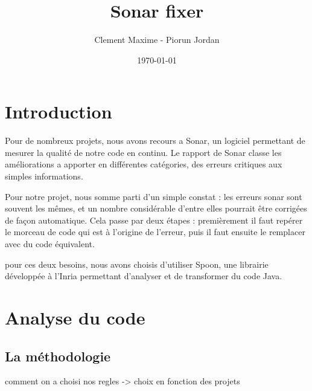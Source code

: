 \documentclass[a4paper]{article}
\begin{document}
\clearpage
\vspace*{\fill}
\begin{center}
\begin{minipage}{.6\textwidth}
\title{Sonar fixer}
\author{Clement Maxime - Piorun Jordan}
\date{\today}
\maketitle
\end{minipage}

\end{center}
\vfill %
\clearpage

\newpage

\section{Introduction}
\par Pour de nombreux projets, nous avons recours a Sonar, un logiciel permettant de mesurer la qualité de notre code en continu. Le rapport de Sonar classe les améliorations a apporter en différentes catégories, des erreurs critiques aux simples informations.
\\
\par Pour notre projet, nous somme parti d'un simple constat : les erreurs sonar sont souvent les mêmes, et un nombre considérable d'entre elles pourrait être corrigées de façon automatique. Cela passe par deux étapes : premièrement il faut repérer le morceau de code qui est à l'origine de l'erreur, puis il faut ensuite le remplacer avec du code équivalent.
\\
\par pour ces deux besoins, nous avons choisis d'utiliser Spoon, une librairie développée à l'Inria permettant d'analyser et de transformer du code Java.

\newpage
\section{Analyse du code}
\subsection{La méthodologie}
comment on a choisi nos regles -> choix en fonction des projets
\end{document}
